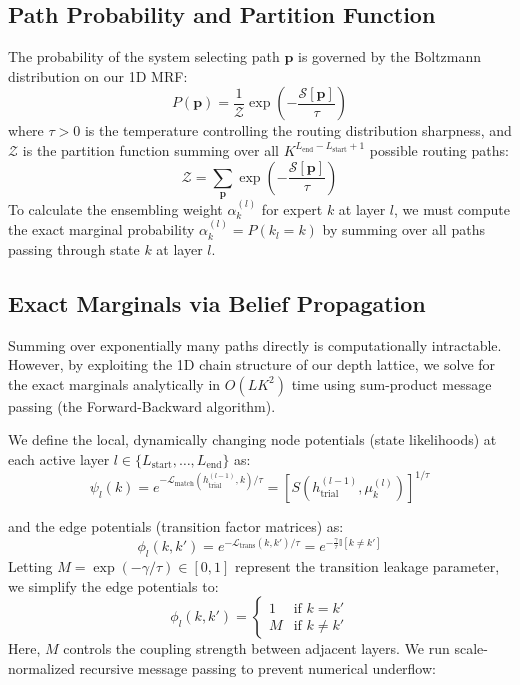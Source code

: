 \subsection{Path Probability and Partition Function}
The probability of the system selecting path $\mathbf{p}$ is governed by the Boltzmann distribution on our 1D MRF:
\begin{equation}
    P(\mathbf{p}) = \frac{1}{\mathcal{Z}} \exp\left( -\frac{\mathcal{S}[\mathbf{p}]}{\tau} \right)
\end{equation}
where $\tau > 0$ is the temperature controlling the routing distribution sharpness, and $\mathcal{Z}$ is the partition function summing over all $K^{L_{\text{end}}-L_{\text{start}}+1}$ possible routing paths:
\begin{equation}
    \mathcal{Z} = \sum_{\mathbf{p}} \exp\left( -\frac{\mathcal{S}[\mathbf{p}]}{\tau} \right)
\end{equation}
To calculate the ensembling weight $\alpha_k^{(l)}$ for expert $k$ at layer $l$, we must compute the exact marginal probability $\alpha_k^{(l)} = P(k_l = k)$ by summing over all paths passing through state $k$ at layer $l$.

\subsection{Exact Marginals via Belief Propagation}
Summing over exponentially many paths directly is computationally intractable. However, by exploiting the 1D chain structure of our depth lattice, we solve for the exact marginals analytically in $O(L K^2)$ time using sum-product message passing (the Forward-Backward algorithm).

We define the local, dynamically changing node potentials (state likelihoods) at each active layer $l \in \{L_{\text{start}}, \dots, L_{\text{end}}\}$ as:
\begin{equation}
    \psi_l(k) = e^{-\mathcal{L}_{\text{match}}(h_{\text{trial}}^{(l-1)}, k)/\tau} = \left[ S(h_{\text{trial}}^{(l-1)}, \mu_k^{(l)}) \right]^{1/\tau}
\end{equation}

and the edge potentials (transition factor matrices) as:
\begin{equation}
    \phi_l(k, k') = e^{-\mathcal{L}_{\text{trans}}(k, k')/\tau} = e^{-\frac{\gamma}{\tau} \mathbb{I}[k \ne k']}
\end{equation}
Letting $M = \exp(-\gamma/\tau) \in [0, 1]$ represent the transition leakage parameter, we simplify the edge potentials to:
\begin{equation}
    \phi_l(k, k') = \begin{cases} 1 & \text{if } k = k' \\ M & \text{if } k \ne k' \end{cases}
\end{equation}
Here, $M$ controls the coupling strength between adjacent layers. We run scale-normalized recursive message passing to prevent numerical underflow:

